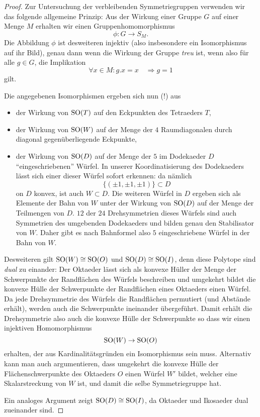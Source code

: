 \documentclass{book}
\begin{document}
\begin{proof}
    Zur Untersuchung der verbleibenden Symmetriegruppen verwenden wir das
    folgende allgemeine Prinzip: Aus der Wirkung einer Gruppe $G$ auf einer
    Menge $M$ erhalten wir einen Gruppenhomomorphismus
    \[
        \phi: G \to S_M.
    \]
    Die Abbildung $\phi$ ist desweiteren injektiv (also insbesondere ein
    Isomorphismus auf ihr Bild), genau dann wenn die Wirkung der Gruppe {\em
    treu} ist, wenn also für alle $g \in G$, die Implikation
    \[
        \forall x \in M : g.x = x \quad \Rightarrow g = 1
    \]
    gilt.

    Die angegebenen Isomorphismen ergeben sich nun (!) aus 
    \begin{itemize}
        \item der Wirkung von $\operatorname{SO}(T)$ auf den Eckpunkten des Tetraeders $T$,
        \item der Wirkung von $\operatorname{SO}(W)$ auf der Menge der $4$ Raumdiagonalen durch diagonal gegenüberliegende Eckpunkte,
        \item der Wirkung von $\operatorname{SO}(D)$ auf der Menge der $5$ im Dodekaeder $D$
            ``eingeschriebenen'' Würfel. In unserer Koordinatisierung des
            Dodekaeders lässt sich einer dieser Würfel sofort erkennen: da nämlich 
            \[
                \{(\pm 1, \pm 1, \pm 1) \} \subset D
            \]
            on $D$ konvex, ist auch $W \subset D$. Die weiteren Würfel in $D$ ergeben
            sich als Elemente der Bahn von $W$ unter der Wirkung von
            $\operatorname{SO}(D)$ auf der Menge der Teilmengen von $D$. $12$ der $24$
            Drehsymmetrien dieses Würfels sind auch Symmetrien des umgebenden
            Dodekaeders und bilden genau den Stabilisator von $W$. Daher gibt
            es nach Bahnformel also $5$ eingeschriebene Würfel in der Bahn von
            $W$.
    \end{itemize}

    Desweiteren gilt $\operatorname{SO}(W) \cong \operatorname{SO}(O)$ und $\operatorname{SO}(D) \cong \operatorname{SO}(I)$, denn
    diese Polytope sind {\em dual} zu einander: Der Oktaeder lässt sich als
    konvexe Hüller der Menge der Schwerpunkte der Randflächen des Würfels
    beschreiben und umgekehrt bildet die konvexe Hülle der Schwerpunkte der
    Randflächen eines Oktaeders einen Würfel. Da jede Drehsymmetrie des Würfels
    die Randflächen permutiert (und Abstände erhält), werden auch die
    Schwerpunkte ineinander übergeführt. Damit erhält die Drehsymmetrie also
    auch die konvexe Hülle der Schwerpunkte so dass wir einen injektiven Homomorphismus
    \[
        \operatorname{SO}(W) \to \operatorname{SO}(O)
    \]
    erhalten, der aus Kardinalitätsgründen ein Isomorphismus sein muss.
    Alternativ kann man auch argumentieren, dass umgekehrt die konvexe Hülle
    der Flächenschwerpunkte des Oktaeders $O$ einen Würfel $W'$ bildet, welcher
    eine Skalarstreckung von $W$ ist, und damit die selbe Symmetriegruppe hat. 

    Ein analoges Argument zeigt $\operatorname{SO}(D) \cong \operatorname{SO}(I)$, da Oktaeder und
    Ikosaeder dual zueinander sind.
\end{proof}
\end{document}
